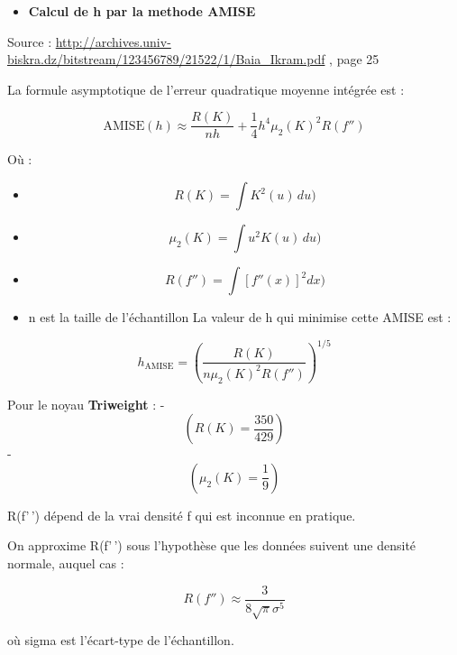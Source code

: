 \documentclass[
  12pt,
]{article}
\providecommand{\tightlist}{%
  \setlength{\itemsep}{0pt}\setlength{\parskip}{0pt}}
\begin{document}
\begin{itemize}
\tightlist
\item
  \textbf{Calcul de h par la methode AMISE}
\end{itemize}

Source :
\url{http://archives.univ-biskra.dz/bitstream/123456789/21522/1/Baia_Ikram.pdf}
, page 25

La formule asymptotique de l'erreur quadratique moyenne intégrée est :

\[
\text{AMISE}(h) \approx \frac{R(K)}{n h} + \frac{1}{4} h^4 \mu_2(K)^2 R(f'')
\]

Où :

\begin{itemize}
\tightlist
\item
  \[ R(K) = \int K^2(u)\,du )\]
\item
  \[ \mu_2(K) = \int u^2 K(u)\,du )\]
\item
  \[ R(f'') = \int [f''(x)]^2 dx )\]
\item
  n est la taille de l'échantillon La valeur de h qui minimise cette
  AMISE est :
\end{itemize}

\[
h_{\text{AMISE}} = \left( \frac{R(K)}{n \mu_2(K)^2 R(f'')} \right)^{1/5}
\]

Pour le noyau \textbf{Triweight} : - \[( R(K) = \frac{350}{429} )\] -
\[( \mu_2(K) = \frac{1}{9} )\]

R(f'\,') dépend de la vrai densité f qui est inconnue en pratique.

On approxime R(f'\,') sous l'hypothèse que les données suivent une
densité normale, auquel cas :

\[
R(f'') \approx \frac{3}{8 \sqrt{\pi} \sigma^5}
\]

où sigma est l'écart-type de l'échantillon.
\end{document}
